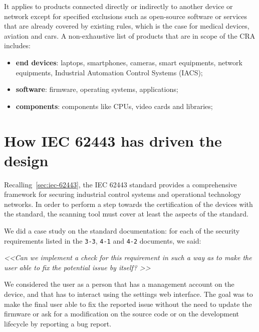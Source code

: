 It applies to products connected directly or indirectly to another device or network except for specified exclusions such as open-source software or services that are already covered by existing rules, which is the case for medical devices, aviation and cars. A non-exhaustive list of products that are in scope of the CRA includes:~\cite{cra-overview}
\begin{itemize}
  \item \textbf{end devices}: laptops, smartphones, cameras, smart equipments, network equipments, Industrial Automation Control Systems (IACS);
  \item \textbf{software}: firmware, operating systems, applications;
  \item \textbf{components}: components like CPUs, video cards and libraries;
\end{itemize}


\section{How IEC 62443 has driven the design}
\label{sec:iec-62443-driven-design}

Recalling~\cref{sec:iec-62443}, the IEC 62443 standard provides a comprehensive framework for securing industrial control systems and operational technology networks. In order to perform a step towards the certification of the devices with the standard, the scanning tool must cover at least the aspects of the standard.

We did a case study on the standard documentation: for each of the security requirements listed in the \texttt{3-3}, \texttt{4-1} and \texttt{4-2} documents, we said:
\begin{mdframed}
  \textit{\textless\textless  Can we implement a check for this requirement in such a way as to make the user able to fix the potential issue by itself? \textgreater\textgreater}
\end{mdframed}
We considered the user as a person that has a management account on the device, and that has to interact using the settings web interface. The goal was to make the final user able to fix the reported issue without the need to update the firmware or ask for a modification on the source code or on the development lifecycle by reporting a bug report.

